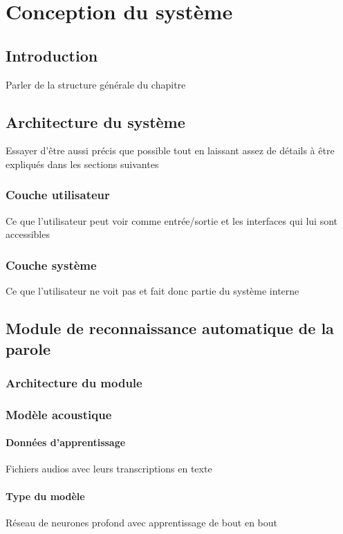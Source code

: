 \chapter{Conception du système}

\section{Introduction}
Parler de la structure générale du chapitre
\section{Architecture du système}
Essayer d'être aussi précis que possible tout en laissant assez de détails à être expliqués dans les sections suivantes
	\subsection{Couche utilisateur}
	Ce que l'utilisateur peut voir comme entrée/sortie et les interfaces qui lui sont accessibles
	\subsection{Couche système }
	Ce que l'utilisateur ne voit pas et fait donc partie du système interne

\section{Module de reconnaissance automatique de la parole}
	\subsection{Architecture du module}
	\subsection{Modèle acoustique}
		\subsubsection*{Données d'apprentissage}
		Fichiers audios avec leurs transcriptions en texte
		\subsubsection*{Type du modèle}
		Réseau de neurones profond avec apprentissage de bout en bout
